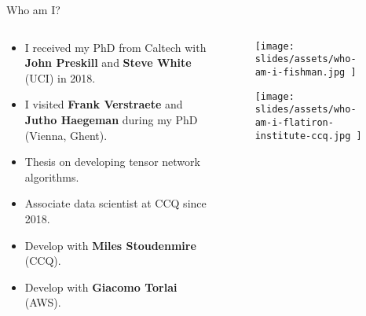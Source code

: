 \begin{frame}{Who am I?}

\begin{columns}

  \begin{column}[T, onlytextwidth]{.6\textwidth}%

    \setlength{\partopsep}{0pt}%

    \begin{itemize}[<+->]

      \item I received my PhD from Caltech with \textbf{John Preskill} and \textbf{Steve White} (UCI) in 2018.
      \item I visited \textbf{Frank Verstraete} and \textbf{Jutho Haegeman} during my PhD (Vienna, Ghent).
      \item Thesis on developing tensor network algorithms.
      \item Associate data scientist at CCQ since 2018.
      \item Develop  with \textbf{Miles Stoudenmire} (CCQ).
      \item Develop  with \textbf{Giacomo Torlai} (AWS).

    \end{itemize}

  \end{column}

  \begin{column}[T]{0.3\textwidth}

    \begin{figure}[T]

      \texttt{[image: 
        slides/assets/who-am-i-fishman.jpg
      ]}
      \caption{}

    \end{figure}

    \begin{figure}

      \centering
      \texttt{[image: 
        slides/assets/who-am-i-flatiron-institute-ccq.jpg
      ]}

    \end{figure}

    \begin{columns}

      \begin{column}[T, onlytextwidth]{0.5\textwidth}%


\end{column}
\end{columns}
\end{column}
\end{columns}
\end{frame}
